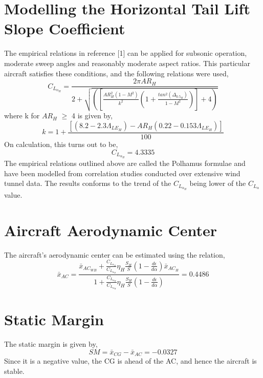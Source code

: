 \documentclass[letterpaper,12pt]{article}
\begin{document}
\section{Modelling the Horizontal Tail Lift Slope Coefficient}
The empirical relations in reference [1] can be applied for subsonic operation, moderate sweep angles and reasonably moderate aspect ratios. This particular aircraft satisfies these conditions, and the following relations were used, 
\begin{equation*}
C_{L_{\alpha_H}} = \frac{2\pi AR_H}{2+\sqrt{\left(\left[\frac{AR_H^2(1-M^2)}{k^2}\left(1+\frac{tan^2(\Delta_{0.5_H})}{1-M^2}\right)\right] + 4\right)}}
\end{equation*}
where k for $AR_H$ $\geq$ 4 is given by,
\begin{equation*}
k = 1 + \frac{[(8.2-2.3\Lambda_{LE_H}) - AR_H(0.22 - 0.153\Lambda_{LE_H})]}{100}
\end{equation*}
On calculation, this turns out to be,
\begin{equation*}
C_{L_{\alpha_H}} = 4.3335
\end{equation*}
The empirical relations outlined above are called the Polhamus formulae and have been modelled from correlation studies conducted over extensive wind tunnel data. The results conforms to the trend of the $C_{L_{\alpha_H}}$ being lower of the $C_{L_{\alpha}}$ value.
\section{Aircraft Aerodynamic Center}
The aircraft's aerodynamic center can be estimated using the relation,
\begin{equation*}
\bar{x}_{AC} = \frac{\bar{x}_{AC_{WB}}+\frac{C_{L_{\alpha_H}}}{C_{L_{\alpha_H}}}\eta_H\frac{S_H}{S}\left(1 - \frac{d\epsilon}{d\alpha}\right)\bar{x}_{AC_H}}{1 + \frac{C_{L_{\alpha_H}}}{C_{L_{\alpha_H}}}\eta_H\frac{S_H}{S}\left(1 - \frac{d\epsilon}{d\alpha}\right)} = 0.4486
\end{equation*}
\section{Static Margin}
The static margin is given by,
\begin{equation*}
SM = \bar{x}_{CG} - \bar{x}_{AC} = -0.0327
\end{equation*}
Since it is a negative value, the CG is ahead of the AC, and hence the aircraft is stable.
\end{document}
